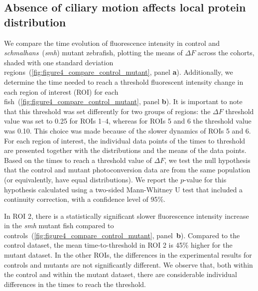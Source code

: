 \documentclass[fleqn]{wlscirep}
\begin{document}
\subsection*{Absence of ciliary motion affects local protein distribution}
We compare the time evolution of fluorescence intensity in control and \emph{schmalhans}~(\emph{smh}) mutant zebrafish, plotting the means of $\Delta F$ across the cohorts, shaded with one standard deviation regions~(\cref{fig:figure4_compare_control_mutant}, panel \textbf{a}). Additionally, we determine the time needed to reach a threshold fluorescent intensity change in each region of interest (ROI) for each fish~(\cref{fig:figure4_compare_control_mutant}, panel \textbf{b}). It is important to note that this threshold was set differently for two groups of regions: the $\Delta F$ threshold value was set to 0.25 for ROIs 1--4, whereas for ROIs 5 and 6 the threshold value was 0.10. This choice was made because of the slower dynamics of ROIs 5 and 6. For each region of interest, the individual data points of the times to threshold are presented together with the distributions and the means of the data points. Based on the times to reach a threshold value of $\Delta F$, we test the null hypothesis that the control and mutant photoconversion data are from the same population (or equivalently, have equal distributions). We report the $p$-value for this hypothesis calculated using a two-sided Mann-Whitney U test that included a continuity correction, with a confidence level of 95\%. 

In ROI 2, there is a statistically significant slower fluorescence intensity increase in the \emph{smh} mutant fish compared to controls~(\cref{fig:figure4_compare_control_mutant}, panel~\textbf{b}). Compared to the control dataset, the mean time-to-threshold in ROI 2 is 45\% higher for the mutant dataset. In the other ROIs, the differences in the experimental results for controls and mutants are not significantly different. We observe that, both within the control and within the mutant dataset, there are considerable individual differences in the times to reach the threshold.
\end{document}

